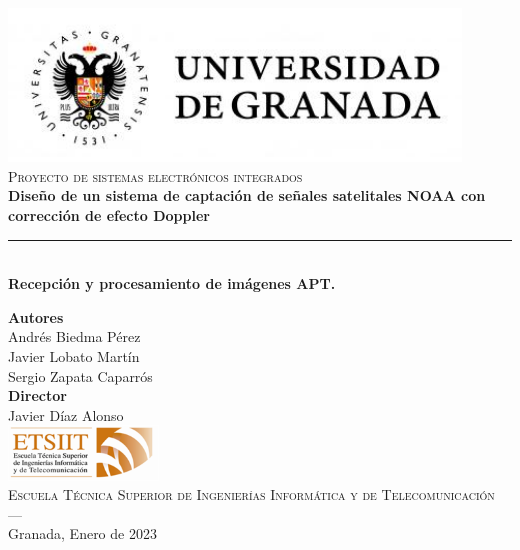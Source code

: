 \begin{titlepage}
 
 
\newlength{\centeroffset}
\setlength{\centeroffset}{-0.5\oddsidemargin}
\addtolength{\centeroffset}{0.5\evensidemargin}
\thispagestyle{empty}

\noindent\hspace*{\centeroffset}\begin{minipage}{\textwidth}

\centering
\includegraphics[width=0.9\textwidth]{imagenes/logo_ugr.jpg}\\[1.4cm]

\textsc{ \Large Proyecto de sistemas electrónicos integrados}\\[1cm]
% 
{\LARGE \bfseries Diseño de un sistema de captación de señales satelitales NOAA con corrección de efecto Doppler\\
}
\noindent\rule[-1ex]{\textwidth}{3pt}\\[3.5ex]
{\large\bfseries Recepción y procesamiento de imágenes APT.}
\end{minipage}

\vspace{1cm}
\noindent\hspace*{\centeroffset}\begin{minipage}{\textwidth}
\centering

\textbf{Autores}\\ {Andrés Biedma Pérez\\Javier Lobato Martín\\Sergio Zapata Caparrós}\\[2.5ex]
\textbf{Director}\\
{Javier Díaz Alonso}\\[2cm]
\includegraphics[width=0.3\textwidth]{imagenes/etsiit_logo.png}\\[0.1cm]
\textsc{Escuela Técnica Superior de Ingenierías Informática y de Telecomunicación}\\
\textsc{---}\\
Granada, Enero de 2023
\end{minipage}
\end{titlepage}


